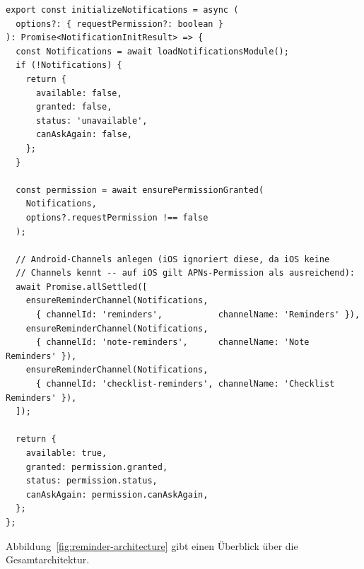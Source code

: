 \begin{lstlisting}[style=skyline-ts,
  caption={Vollstaendige Initialisierung: Permission-Check und Channel-Anlage
           (services/notifications.ts)},
  label={lst:init_notif}]
export const initializeNotifications = async (
  options?: { requestPermission?: boolean }
): Promise<NotificationInitResult> => {
  const Notifications = await loadNotificationsModule();
  if (!Notifications) {
    return {
      available: false,
      granted: false,
      status: 'unavailable',
      canAskAgain: false,
    };
  }

  const permission = await ensurePermissionGranted(
    Notifications,
    options?.requestPermission !== false
  );

  // Android-Channels anlegen (iOS ignoriert diese, da iOS keine
  // Channels kennt -- auf iOS gilt APNs-Permission als ausreichend):
  await Promise.allSettled([
    ensureReminderChannel(Notifications,
      { channelId: 'reminders',           channelName: 'Reminders' }),
    ensureReminderChannel(Notifications,
      { channelId: 'note-reminders',      channelName: 'Note Reminders' }),
    ensureReminderChannel(Notifications,
      { channelId: 'checklist-reminders', channelName: 'Checklist Reminders' }),
  ]);

  return {
    available: true,
    granted: permission.granted,
    status: permission.status,
    canAskAgain: permission.canAskAgain,
  };
};
\end{lstlisting}

Abbildung~\ref{fig:reminder-architecture} gibt einen Überblick über die Gesamtarchitektur.

